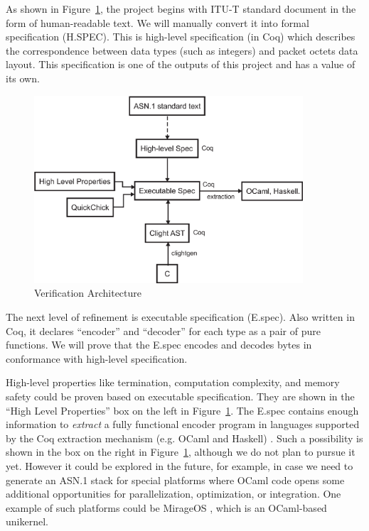 \documentclass[acmsmall,nonacm]{acmart}
\begin{document}
As shown in Figure~\ref{fig:components}, the project begins with ITU-T
standard document in the form of human-readable text. We will manually
convert it into formal specification (H.SPEC). This is high-level
specification (in Coq) which describes the correspondence between data
types (such as integers) and packet octets data layout. This
specification is one of the outputs of this project and has a value of
its own.

\begin{figure}[h!]
  \centering
  \includegraphics[width=10cm]{VerificationArchitectureDiagram.eps}
  \caption{Verification Architecture}
  \label{fig:components}
\end{figure}

The next level of refinement is executable specification (E.spec). Also
written in Coq, it declares ``encoder'' and ``decoder'' for each type
as a pair of pure functions. We will prove that the E.spec encodes and decodes bytes in conformance with high-level
specification.

High-level properties like termination, computation complexity, and
memory safety could be proven based on executable specification. They
are shown in the ``High Level Properties'' box on the left in Figure~\ref{fig:components}. The E.spec contains enough
information to \textit{extract} a fully functional encoder program in
languages supported by the Coq extraction mechanism (e.g. OCaml and
Haskell) \cite{Extraction}. Such a possibility is shown in the box
on the right in Figure~\ref{fig:components}, although we do not plan to
pursue it yet. However it could be explored in the future, for example,
in case we need to generate an ASN.1 stack for special platforms where
OCaml code opens some additional opportunities for parallelization,
optimization, or integration. One example of such platforms could be
MirageOS \cite{MirageOS}, which is an OCaml-based unikernel.
\end{document}
